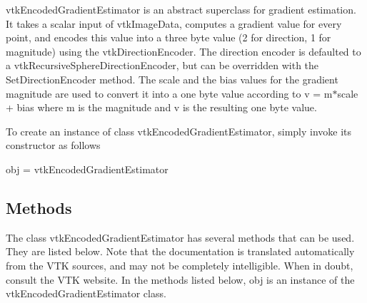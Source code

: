 vtk\-Encoded\-Gradient\-Estimator is an abstract superclass for gradient estimation. It takes a scalar input of vtk\-Image\-Data, computes a gradient value for every point, and encodes this value into a three byte value (2 for direction, 1 for magnitude) using the vtk\-Direction\-Encoder. The direction encoder is defaulted to a vtk\-Recursive\-Sphere\-Direction\-Encoder, but can be overridden with the Set\-Direction\-Encoder method. The scale and the bias values for the gradient magnitude are used to convert it into a one byte value according to v = m$\ast$scale + bias where m is the magnitude and v is the resulting one byte value.

To create an instance of class vtk\-Encoded\-Gradient\-Estimator, simply invoke its constructor as follows \begin{DoxyVerb}  obj = vtkEncodedGradientEstimator
\end{DoxyVerb}
 \hypertarget{vtkwidgets_vtkxyplotwidget_Methods}{}\subsection{Methods}\label{vtkwidgets_vtkxyplotwidget_Methods}
The class vtk\-Encoded\-Gradient\-Estimator has several methods that can be used. They are listed below. Note that the documentation is translated automatically from the V\-T\-K sources, and may not be completely intelligible. When in doubt, consult the V\-T\-K website. In the methods listed below, {\ttfamily obj} is an instance of the vtk\-Encoded\-Gradient\-Estimator class. 
